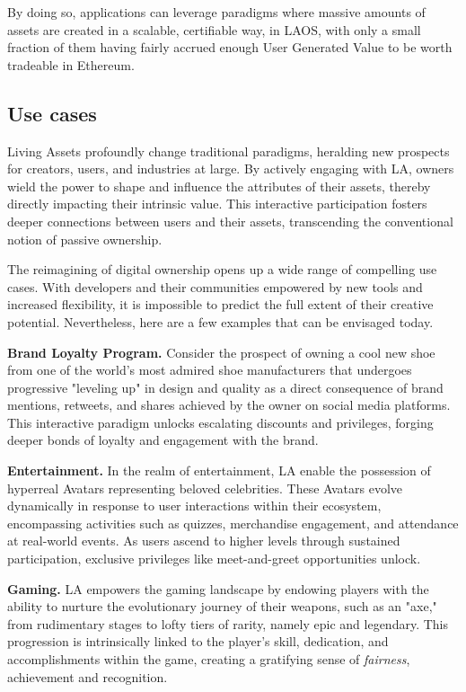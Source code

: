 By doing so, applications can leverage paradigms where massive amounts
of assets are created in a scalable, certifiable way, in LAOS, with only
a small fraction of them having fairly accrued enough User Generated Value 
to be worth tradeable in Ethereum.


\subsection{Use cases}\label{sec:use cases}

Living Assets profoundly change traditional paradigms,
heralding new prospects for creators, users, and industries at large.
By actively engaging with LA, owners wield the power
to shape and influence the attributes of their assets,
thereby directly impacting their intrinsic value.
This interactive participation fosters deeper connections between
users and their assets, transcending the conventional
notion of passive ownership.

The reimagining of digital ownership opens up
a wide range of compelling use cases.
With developers and their communities empowered by
new tools and increased flexibility,
it is impossible to predict the full extent of their
creative potential. Nevertheless, here are a few examples
that can be envisaged today.

{\bf Brand Loyalty Program.}
Consider the prospect of owning a 
cool new shoe from one of the world's most admired shoe manufacturers
that undergoes progressive "leveling up" in
design and quality as a direct consequence of brand mentions,
retweets, and shares achieved by the owner on social media platforms.
This interactive paradigm unlocks escalating discounts and privileges, forging deeper bonds of loyalty and engagement with the brand.

{\bf Entertainment.}
In the realm of entertainment,
LA enable the possession
of hyperreal Avatars representing beloved celebrities.
These Avatars evolve dynamically in response
to user interactions within their ecosystem,
encompassing activities such as quizzes,
merchandise engagement, and attendance at real-world events.
As users ascend to higher levels through sustained participation,
exclusive privileges like meet-and-greet opportunities unlock.

{\bf Gaming.}
LA empowers the gaming landscape by
endowing players with the ability to nurture the evolutionary journey
of their weapons, such as an "axe,"
from rudimentary stages to lofty tiers of rarity,
namely epic and legendary.
This progression is intrinsically linked to the player's skill,
dedication, and accomplishments within the game,
creating a gratifying sense of {\it fairness}, achievement and recognition.

